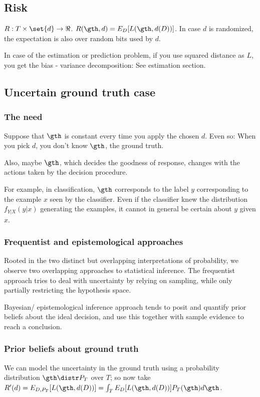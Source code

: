 \documentclass[oneside, article]{memoir}
\begin{document}
\subsection{Risk}
$R:T\times\set{d} \to \Re$. $R(\gth,d) = E_{D}[L(\gth,d(D))]$. In case $d$ is randomized, the expectation is also over random bits used by $d$.

In case of the estimation or prediction problem, if you use squared distance as $L$, you get the bias - variance decomposition: See estimation section.

\subsection{Uncertain ground truth case}
\subsubsection{The need}
Suppose that $\gth$ is constant every time you apply the chosen $d$. Even so: When you pick $d$, you don't know $\gth$, the ground truth.

Also, maybe $\gth$, which decides the goodness of response, changes with the actions taken by the decision procedure.

For example, in classification, $\gth$ corresponds to the label $y$ corresponding to the example $x$ seen by the classifier. Even if the classifier knew the distribution $f_{Y|X}(y|x)$ generating the examples, it cannot in general be certain about $y$ given $x$.

\subsubsection{Frequentist and epistemological approaches}
Rooted in the two distinct but overlapping interpretations of probability, we observe two overlapping approaches to statistical inference. The frequentist approach tries to deal with uncertainty by relying on sampling, while only partially restricting the hypothesis space.

Bayesian/ epistemological inference approach tends to posit and quantify prior beliefs about the ideal decision, and use this together with sample evidence to reach a conclusion.

\subsubsection{Prior beliefs about ground truth}
We can model the uncertainty in the ground truth using a probability distribution $\gth \distr P_T$ over $T$; so now take\\ $R'(d) = E_{D, P_T}[L(\gth,d(D))] = \int_T E_D[L(\gth,d(D))]P_T(\gth) d \gth$.
\end{document}
